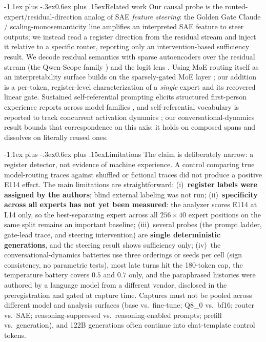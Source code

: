 \documentclass[10pt]{article}
\makeatletter
\renewcommand\section{\@startsection{section}{1}{\z@}%
  {-1.1ex plus -.3ex}{0.6ex plus .15ex}{\normalfont\large\bfseries}}
\makeatother
\begin{document}
\vspace{-0.4em}
\section{Related work}
\vspace{-0.2em}
Our causal probe is the routed-expert/residual-direction analog of SAE
\emph{feature steering}: the Golden Gate Claude / scaling-monosemanticity line
\cite{templeton2024,ggc2024} amplifies an interpreted SAE feature to steer
outputs; we instead read a register direction from the residual stream and inject
it relative to a specific router, reporting only an intervention-based
sufficiency result.
We decode residual semantics with sparse autoencoders \cite{templeton2024} over
the residual stream (the Qwen-Scope family \cite{qwenscope}) and the logit
lens \cite{logitlens}. Using MoE routing itself as an interpretability surface
builds on the sparsely-gated MoE layer \cite{shazeer2017}; our addition is a
per-token, register-level characterization of a \emph{single} expert and its
recovered linear gate. Sustained self-referential prompting elicits structured
first-person experience reports across model families \cite{berg2025}, and
self-referential vocabulary is reported to track concurrent activation dynamics
\cite{dadfar2026}; our conversational-dynamics result bounds that
correspondence on this axis: it holds on composed spans and dissolves on
literally reused ones.

\vspace{-0.4em}
\section{Limitations}
\vspace{-0.2em}
The claim is deliberately narrow: a register detector, not evidence of machine
experience. A control comparing true model-routing traces against shuffled or
fictional traces did not produce a positive E114 effect. The main limitations are
straightforward: (i)~\textbf{register labels were assigned by the authors}; blind
external labeling was not run; (ii)~\textbf{specificity across all experts has not
yet been measured}: the analyzer scores E114 at L14 only, so the
best-separating expert across all $256{\times}40$ expert positions on the same split remains
an important baseline; (iii)~several probes (the prompt ladder, gate-lead trace,
and steering intervention) are \textbf{single deterministic generations}, and the
steering result shows sufficiency only; (iv)~the conversational-dynamics
batteries use three orderings or seeds per cell (sign consistency, no parametric
tests), most late turns hit the 180-token cap, the temperature battery covers
$0.5$ and $0.7$ only, and the paraphrased histories were authored by a language
model from a different vendor, disclosed in the preregistration and gated at
capture time. Captures must not be pooled across
different model and analysis surfaces (base vs.\ fine-tune; Q8\_0 vs.\ bf16;
router vs.\ SAE; reasoning-suppressed vs.\ reasoning-enabled prompts; prefill
vs.\ generation), and 122B generations often continue into chat-template control
tokens.
\end{document}
